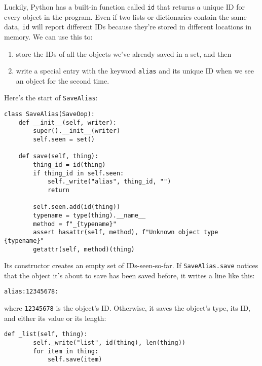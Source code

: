\documentclass{scrbook}
\begin{document}
Luckily,
Python has a built-in function called \texttt{id}
that returns a unique ID for every object in the program.
Even if two lists or dictionaries contain the same data,
\texttt{id} will report different IDs
because they're stored in different locations in memory.
We can use this to:

\begin{enumerate}

\item 

store the IDs of all the objects we've already saved
    in a set, and then



\item 

write a special entry with the keyword \texttt{alias}
    and its unique ID
    when we see an object for the second time.



\end{enumerate}


Here's the start of \texttt{SaveAlias}:


\begin{lstlisting}[frame=single,frameround=tttt]
class SaveAlias(SaveOop):
    def __init__(self, writer):
        super().__init__(writer)
        self.seen = set()

    def save(self, thing):
        thing_id = id(thing)
        if thing_id in self.seen:
            self._write("alias", thing_id, "")
            return

        self.seen.add(id(thing))
        typename = type(thing).__name__
        method = f"_{typename}"
        assert hasattr(self, method), f"Unknown object type {typename}"
        getattr(self, method)(thing)
\end{lstlisting}



\noindent Its constructor creates an empty set of IDs-seen-so-far.
If \texttt{SaveAlias.save} notices that the object it's about to save
has been saved before,
it writes a line like this:

\begin{lstlisting}[frame=single,frameround=tttt]
alias:12345678:
\end{lstlisting}


where \texttt{12345678} is the object's ID.
Otherwise,
it saves the object's type,
its ID,
and either its value or its length:


\begin{lstlisting}[frame=single,frameround=tttt]
    def _list(self, thing):
        self._write("list", id(thing), len(thing))
        for item in thing:
            self.save(item)
\end{lstlisting}
\end{document}
